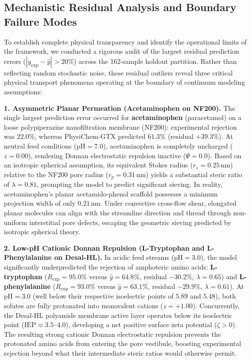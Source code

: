 \documentclass[10pt,twocolumn]{article}
\begin{document}
\subsection{Mechanistic Residual Analysis and Boundary Failure Modes}
\label{subsec:outliers}

To establish complete physical transparency and identify the operational limits of the framework, we conducted a rigorous audit of the largest residual prediction errors ($|y_{\mathrm{exp}} - \hat{y}| > 20\%$) across the 162-sample holdout partition. Rather than reflecting random stochastic noise, these residual outliers reveal three critical physical transport phenomena operating at the boundary of continuum modeling assumptions:

\textbf{1. Asymmetric Planar Permeation (Acetaminophen on NF200).} The single largest prediction error occurred for \textbf{acetaminophen} (paracetamol) on a loose polypiperazine nanofiltration membrane (NF200): experimental rejection was $22.0\%$, whereas PhysiChem-GTX predicted $61.3\%$ (residual $+39.3\%$). At neutral feed conditions ($\mathrm{pH} = 7.0$), acetaminophen is completely uncharged ($z = 0.00$), rendering Donnan electrostatic repulsion inactive ($\Psi = 0.0$). Based on an isotropic spherical assumption, its equivalent Stokes radius ($r_s = 0.25\,\mathrm{nm}$) relative to the NF200 pore radius ($r_p = 0.31\,\mathrm{nm}$) yields a substantial steric ratio of $\lambda = 0.81$, prompting the model to predict significant sieving. In reality, acetaminophen's planar acetamido-phenol scaffold possesses a minimum projection width of only $0.21\,\mathrm{nm}$. Under convective cross-flow shear, elongated planar molecules can align with the streamline direction and thread through non-uniform interstitial pore defects, escaping the geometric sieving predicted by isotropic spherical theory.

\textbf{2. Low-pH Cationic Donnan Repulsion (L-Tryptophan and L-Phenylalanine on Desal-HL).} In acidic feed streams ($\mathrm{pH} = 3.0$), the model significantly underpredicted the rejection of amphoteric amino acids: \textbf{L-tryptophan} ($R_{\mathrm{exp}} = 95.0\%$ versus $\hat{y} = 64.8\%$, residual $-30.2\%$, $\lambda = 0.65$) and \textbf{L-phenylalanine} ($R_{\mathrm{exp}} = 93.0\%$ versus $\hat{y} = 63.1\%$, residual $-29.9\%$, $\lambda = 0.61$). At $\mathrm{pH} = 3.0$ (well below their respective isoelectric points of $5.89$ and $5.48$), both solutes are fully protonated into monovalent cations ($z = +1.00$). Concurrently, the Desal-HL polyamide membrane active layer operates below its isoelectric point ($\mathrm{IEP} \approx 3.5\text{--}4.0$), developing a net positive surface zeta potential ($\zeta > 0$). The resulting strong cationic Donnan electrostatic repulsion prevents the protonated amino acids from entering the pore vestibule, boosting experimental rejection beyond what their intermediate steric ratios would otherwise permit.
\end{document}
